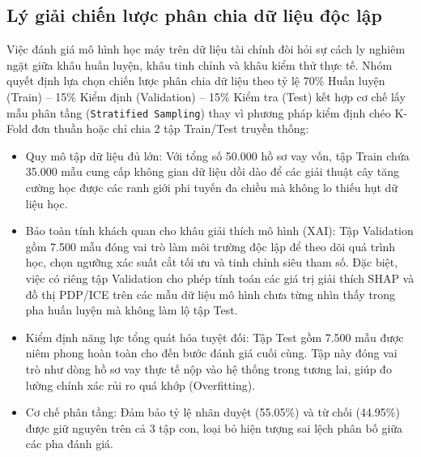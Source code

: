 \documentclass[12pt,a4paper,oneside]{report}
\begin{document}
\subsection{Lý giải chiến lược phân chia dữ liệu độc lập}
Việc đánh giá mô hình học máy trên dữ liệu tài chính đòi hỏi sự cách ly nghiêm ngặt giữa khâu huấn luyện, khâu tinh chỉnh và khâu kiểm thử thực tế. Nhóm quyết định lựa chọn chiến lược phân chia dữ liệu theo tỷ lệ 70\% Huấn luyện (Train) -- 15\% Kiểm định (Validation) -- 15\% Kiểm tra (Test) kết hợp cơ chế lấy mẫu phân tầng (\texttt{Stratified Sampling}) thay vì phương pháp kiểm định chéo K-Fold đơn thuần hoặc chỉ chia 2 tập Train/Test truyền thống:
\begin{itemize}
    \item Quy mô tập dữ liệu đủ lớn: Với tổng số 50.000 hồ sơ vay vốn, tập Train chứa 35.000 mẫu cung cấp không gian dữ liệu dồi dào để các giải thuật cây tăng cường học được các ranh giới phi tuyến đa chiều mà không lo thiếu hụt dữ liệu học.
    \item Bảo toàn tính khách quan cho khâu giải thích mô hình (XAI): Tập Validation gồm 7.500 mẫu đóng vai trò làm môi trường độc lập để theo dõi quá trình học, chọn ngưỡng xác suất cắt tối ưu và tinh chỉnh siêu tham số. Đặc biệt, việc có riêng tập Validation cho phép tính toán các giá trị giải thích SHAP và đồ thị PDP/ICE trên các mẫu dữ liệu mô hình chưa từng nhìn thấy trong pha huấn luyện mà không làm lộ tập Test.
    \item Kiểm định năng lực tổng quát hóa tuyệt đối: Tập Test gồm 7.500 mẫu được niêm phong hoàn toàn cho đến bước đánh giá cuối cùng. Tập này đóng vai trò như dòng hồ sơ vay thực tế nộp vào hệ thống trong tương lai, giúp đo lường chính xác rủi ro quá khớp (Overfitting).
    \item Cơ chế phân tầng: Đảm bảo tỷ lệ nhãn duyệt (55.05\%) và từ chối (44.95\%) được giữ nguyên trên cả 3 tập con, loại bỏ hiện tượng sai lệch phân bố giữa các pha đánh giá.
\end{itemize}
\end{document}
